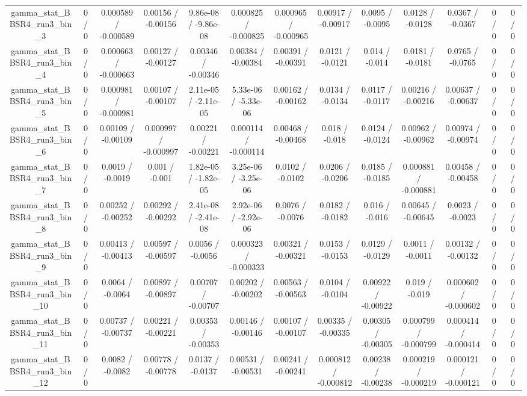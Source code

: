 \documentclass[10pt]{article}
\begin{document}
\begin{table}[htbp]
\begin{center}
\begin{tabular}{|c|c|c|c|c|c|c|c|c|c|c|c|c|}
  gamma_stat_BBSR4_run3_bin_3 & 0 / 0 & 0.000589 / -0.000589 & 0.00156 / -0.00156 & 9.86e-08 / -9.86e-08 & 0.000825 / -0.000825 & 0.000965 / -0.000965 & 0.00917 / -0.00917 & 0.0095 / -0.0095 & 0.0128 / -0.0128 & 0.0367 / -0.0367 & 0 / 0 & 0 / 0 \\ 
  gamma_stat_BBSR4_run3_bin_4 & 0 / 0 & 0.000663 / -0.000663 & 0.00127 / -0.00127 & 0.00346 / -0.00346 & 0.00384 / -0.00384 & 0.00391 / -0.00391 & 0.0121 / -0.0121 & 0.014 / -0.014 & 0.0181 / -0.0181 & 0.0765 / -0.0765 & 0 / 0 & 0 / 0 \\ 
  gamma_stat_BBSR4_run3_bin_5 & 0 / 0 & 0.000981 / -0.000981 & 0.00107 / -0.00107 & 2.11e-05 / -2.11e-05 & 5.33e-06 / -5.33e-06 & 0.00162 / -0.00162 & 0.0134 / -0.0134 & 0.0117 / -0.0117 & 0.00216 / -0.00216 & 0.00637 / -0.00637 & 0 / 0 & 0 / 0 \\ 
  gamma_stat_BBSR4_run3_bin_6 & 0 / 0 & 0.00109 / -0.00109 & 0.000997 / -0.000997 & 0.00221 / -0.00221 & 0.000114 / -0.000114 & 0.00468 / -0.00468 & 0.018 / -0.018 & 0.0124 / -0.0124 & 0.00962 / -0.00962 & 0.00974 / -0.00974 & 0 / 0 & 0 / 0 \\ 
  gamma_stat_BBSR4_run3_bin_7 & 0 / 0 & 0.0019 / -0.0019 & 0.001 / -0.001 & 1.82e-05 / -1.82e-05 & 3.25e-06 / -3.25e-06 & 0.0102 / -0.0102 & 0.0206 / -0.0206 & 0.0185 / -0.0185 & 0.000881 / -0.000881 & 0.00458 / -0.00458 & 0 / 0 & 0 / 0 \\ 
  gamma_stat_BBSR4_run3_bin_8 & 0 / 0 & 0.00252 / -0.00252 & 0.00292 / -0.00292 & 2.41e-08 / -2.41e-08 & 2.92e-06 / -2.92e-06 & 0.0076 / -0.0076 & 0.0182 / -0.0182 & 0.016 / -0.016 & 0.00645 / -0.00645 & 0.0023 / -0.0023 & 0 / 0 & 0 / 0 \\ 
  gamma_stat_BBSR4_run3_bin_9 & 0 / 0 & 0.00413 / -0.00413 & 0.00597 / -0.00597 & 0.0056 / -0.0056 & 0.000323 / -0.000323 & 0.00321 / -0.00321 & 0.0153 / -0.0153 & 0.0129 / -0.0129 & 0.0011 / -0.0011 & 0.00132 / -0.00132 & 0 / 0 & 0 / 0 \\ 
  gamma_stat_BBSR4_run3_bin_10 & 0 / 0 & 0.0064 / -0.0064 & 0.00897 / -0.00897 & 0.00707 / -0.00707 & 0.00202 / -0.00202 & 0.00563 / -0.00563 & 0.0104 / -0.0104 & 0.00922 / -0.00922 & 0.019 / -0.019 & 0.000602 / -0.000602 & 0 / 0 & 0 / 0 \\ 
  gamma_stat_BBSR4_run3_bin_11 & 0 / 0 & 0.00737 / -0.00737 & 0.00221 / -0.00221 & 0.00353 / -0.00353 & 0.00146 / -0.00146 & 0.00107 / -0.00107 & 0.00335 / -0.00335 & 0.00305 / -0.00305 & 0.000799 / -0.000799 & 0.000414 / -0.000414 & 0 / 0 & 0 / 0 \\ 
  gamma_stat_BBSR4_run3_bin_12 & 0 / 0 & 0.0082 / -0.0082 & 0.00778 / -0.00778 & 0.0137 / -0.0137 & 0.00531 / -0.00531 & 0.00241 / -0.00241 & 0.000812 / -0.000812 & 0.00238 / -0.00238 & 0.000219 / -0.000219 & 0.000121 / -0.000121 & 0 / 0 & 0 / 0 \\ 

\end{tabular}
\end{center}
\end{table}
\end{document}
